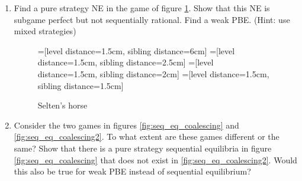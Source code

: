 \documentclass[a4paper,12pt]{article}
\begin{document}
\begin{enumerate}
\item Find a pure strategy NE in the game of figure \ref{fig:selten_ex}. Show that this NE is subgame perfect but not sequentially rational. Find a weak PBE. (Hint: use mixed strategies)
   \begin{figure}[h]
\centering
=[level distance=1.5cm, sibling distance=6cm]
=[level distance=1.5cm, sibling distance=2.5cm]
=[level distance=1.5cm, sibling distance=2cm]
=[level distance=1.5cm, sibling distance=1.5cm]
\caption{Selten's horse}
\label{fig:selten_ex}
\end{figure}

\item Consider the two games in figures \ref{fig:seq_eq_coalescing} and \ref{fig:seq_eq_coalescing2}. To what extent are these games different or the same? Show that there is a pure strategy sequential equilibria in figure \ref{fig:seq_eq_coalescing} that does not exist in \ref{fig:seq_eq_coalescing2}. Would this also be true for  weak PBE instead of sequential equilibrium?
  

\end{enumerate}
\end{document}
